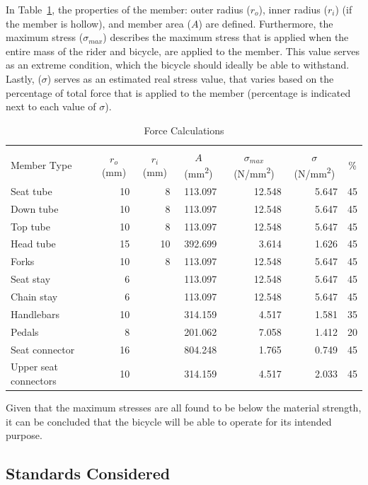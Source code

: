 \documentclass[a4paper,11pt]{article}
\begin{document}
In Table~\ref{tab:fo}, the properties of the member: outer radius ($r_{o}$), inner radius ($r_{i}$) (if the member is hollow), and member area ($A$) are defined. Furthermore, the maximum stress (${\sigma}_{max}$) describes the maximum stress that is applied when the entire mass of the rider and bicycle, are applied to the member. This value serves as an extreme condition, which the bicycle should ideally be able to withstand. Lastly, (${\sigma}$) serves as an estimated real stress value, that varies based on the percentage of total force that is applied to the member (percentage is indicated next to each value of ${\sigma}$).

\begin{table}[!ht]
	\centering
	\caption{Force Calculations}
	\begin{tabular}{l r r r r r r}
		\hline\\[-2ex]
		Member Type&\multicolumn{1}{c}{$r_{o}$ (mm)}&\multicolumn{1}{c}{$r_{i}$ (mm)}&\multicolumn{1}{c}{$A$ (mm\textsuperscript{2})}&\multicolumn{1}{c}{${\sigma}_{max}$ (N/mm\textsuperscript{2})}&\multicolumn{1}{c}{${\sigma}$ (N/mm\textsuperscript{2})}&\multicolumn{1}{c}{\%}\\\hline
		Seat tube&10&8&113.097&12.548&5.647&45\\
		Down tube&10&8&113.097&12.548&5.647&45\\
		Top tube&10&8&113.097&12.548&5.647&45\\
		Head tube&15&10&392.699&3.614&1.626&45\\
		Forks&10&8&113.097&12.548&5.647&45\\
		Seat stay&6&&113.097&12.548&5.647&45\\
		Chain stay&6&&113.097&12.548&5.647&45\\
		Handlebars&10&&314.159&4.517&1.581&35\\
		Pedals&8&&201.062&7.058&1.412&20\\
		Seat connector&16&&804.248&1.765&0.749&45\\
		Upper seat connectors&10&&314.159&4.517&2.033&45\\
	\end{tabular}
	\label{tab:fo}
\end{table}

Given that the maximum stresses are all found to be below the material strength, it can be concluded that the bicycle will be able to operate for its intended purpose.

\subsection{Standards Considered}
\end{document}
